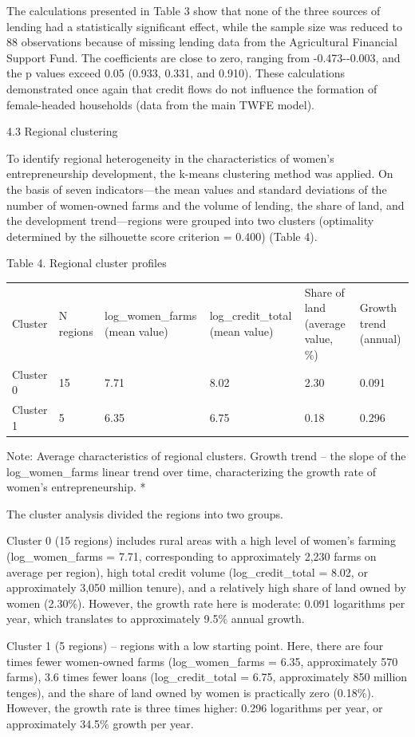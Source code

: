 \documentclass[
]{article}
\begin{document}
The calculations presented in Table 3 show that none of the three
sources of lending had a statistically significant effect, while the
sample size was reduced to 88 observations because of missing lending
data from the Agricultural Financial Support Fund. The coefficients are
close to zero, ranging from -0.473-\/-0.003, and the p values exceed
0.05 (0.933, 0.331, and 0.910). These calculations demonstrated once
again that credit flows do not influence the formation of female-headed
households (data from the main TWFE model).

4.3 Regional clustering

To identify regional heterogeneity in the characteristics of women's
entrepreneurship development, the k-means clustering method was applied.
On the basis of seven indicators---the mean values and standard
deviations of the number of women-owned farms and the volume of lending,
the share of land, and the development trend---regions were grouped into
two clusters (optimality determined by the silhouette score criterion =
0.400) (Table 4).

Table 4. Regional cluster profiles

\begin{longtable}[]{@{}llllll@{}}
\toprule
\endhead
Cluster & N regions & log\_women\_farms (mean value) &
log\_credit\_total (mean value) & Share of land (average value, \%) &
Growth trend (annual)\tabularnewline
Cluster 0 & 15 & 7.71 & 8.02 & 2.30 & 0.091\tabularnewline
Cluster 1 & 5 & 6.35 & 6.75 & 0.18 & 0.296\tabularnewline
\bottomrule
\end{longtable}

Note: Average characteristics of regional clusters. Growth trend -- the
slope of the log\_women\_farms linear trend over time, characterizing
the growth rate of women's entrepreneurship. *

The cluster analysis divided the regions into two groups.

Cluster 0 (15 regions) includes rural areas with a high level of women's
farming (log\_women\_farms = 7.71, corresponding to approximately 2,230
farms on average per region), high total credit volume
(log\_credit\_total = 8.02, or approximately 3,050 million tenure), and
a relatively high share of land owned by women (2.30\%). However, the
growth rate here is moderate: 0.091 logarithms per year, which
translates to approximately 9.5\% annual growth.

Cluster 1 (5 regions) -- regions with a low starting point. Here, there
are four times fewer women-owned farms (log\_women\_farms = 6.35,
approximately 570 farms), 3.6 times fewer loans (log\_credit\_total =
6.75, approximately 850 million tenges), and the share of land owned by
women is practically zero (0.18\%). However, the growth rate is three
times higher: 0.296 logarithms per year, or approximately 34.5\% growth
per year.
\end{document}
